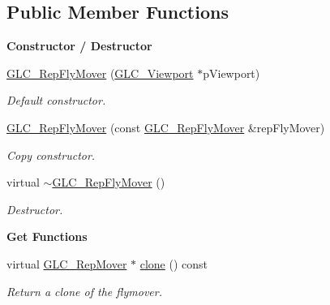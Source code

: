 \subsection*{Public Member Functions}
\begin{Indent}{\bf Constructor / Destructor}\par
\begin{DoxyCompactItemize}
\item 
\hyperlink{class_g_l_c___rep_fly_mover_ab7d568b8716f1a8273be24ad950d07a6}{G\-L\-C\-\_\-\-Rep\-Fly\-Mover} (\hyperlink{class_g_l_c___viewport}{G\-L\-C\-\_\-\-Viewport} $\ast$p\-Viewport)
\begin{DoxyCompactList}\small\item\em Default constructor. \end{DoxyCompactList}\item 
\hyperlink{class_g_l_c___rep_fly_mover_a9111e27612c00852d3aa1d661109625e}{G\-L\-C\-\_\-\-Rep\-Fly\-Mover} (const \hyperlink{class_g_l_c___rep_fly_mover}{G\-L\-C\-\_\-\-Rep\-Fly\-Mover} \&rep\-Fly\-Mover)
\begin{DoxyCompactList}\small\item\em Copy constructor. \end{DoxyCompactList}\item 
virtual \hyperlink{class_g_l_c___rep_fly_mover_ac49b6d476029d3da36a8afa6f68c2735}{$\sim$\-G\-L\-C\-\_\-\-Rep\-Fly\-Mover} ()
\begin{DoxyCompactList}\small\item\em Destructor. \end{DoxyCompactList}\end{DoxyCompactItemize}
\end{Indent}
\begin{Indent}{\bf Get Functions}\par
\begin{DoxyCompactItemize}
\item 
virtual \hyperlink{class_g_l_c___rep_mover}{G\-L\-C\-\_\-\-Rep\-Mover} $\ast$ \hyperlink{class_g_l_c___rep_fly_mover_a0ad50b28276d685798d9fafe129dde7f}{clone} () const 
\begin{DoxyCompactList}\small\item\em Return a clone of the flymover. \end{DoxyCompactList}\end{DoxyCompactItemize}
\end{Indent}
